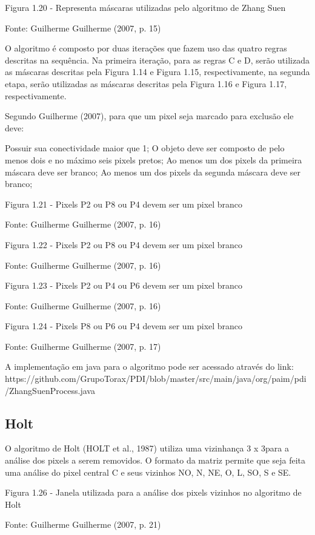 \documentclass[
	12pt,				%
	oneside,			%
	a4paper,			%
	english,			%
	french,				%
	spanish,			%
	brazil,				%
	]{abntex2}
\begin{document}
Figura 1.20 - Representa máscaras utilizadas pelo algoritmo de Zhang Suen

Fonte: Guilherme Guilherme (2007, p. 15)

O algoritmo é composto por duas iterações que fazem uso das quatro regras descritas na sequência. Na primeira iteração, para as regras C e D, serão utilizada as máscaras descritas pela Figura 1.14 e Figura 1.15, respectivamente, na segunda etapa, serão utilizadas as máscaras descritas pela Figura 1.16 e Figura 1.17, respectivamente.

Segundo Guilherme (2007), para que um pixel seja marcado para exclusão ele deve:

Possuir sua conectividade maior que 1;
O objeto deve ser composto de pelo menos dois e no máximo seis pixels pretos;
Ao menos um dos pixels da primeira máscara deve ser branco;
Ao menos um dos pixels da segunda máscara deve ser branco;

Figura 1.21 - Pixels P2 ou P8 ou P4 devem ser um pixel branco 

Fonte: Guilherme Guilherme (2007, p. 16)

Figura 1.22 - Pixels P2 ou P8 ou P4 devem ser um pixel branco

Fonte: Guilherme Guilherme (2007, p. 16)

Figura 1.23 - Pixels P2 ou P4 ou P6 devem ser um pixel branco

Fonte: Guilherme Guilherme (2007, p. 16)

Figura 1.24 - Pixels P8 ou P6 ou P4 devem ser um pixel branco

Fonte: Guilherme Guilherme (2007, p. 17)

 A implementação em java para o algoritmo pode ser acessado através do link:
https://github.com/GrupoTorax/PDI/blob/master/src/main/java/org/paim/pdi/ZhangSuenProcess.java 

\subsection{Holt}    

	O algoritmo de Holt (HOLT et al., 1987) utiliza uma vizinhança 3 x 3para a análise dos pixels a serem removidos. O formato da matriz permite que seja feita uma análise do pixel central C e seus vizinhos NO, N, NE, O, L, SO, S e SE.

Figura 1.26 - Janela utilizada para a análise dos pixels vizinhos no algoritmo de Holt

Fonte: Guilherme Guilherme (2007, p. 21)
\end{document}
